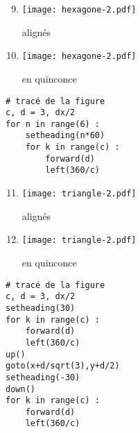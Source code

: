 \documentclass[11pt,a4paper]{article}
\begin{document}
\noindent\begin{minipage}[t]{5cm}
\begin{enumerate}\setcounter{enumi}{8}
\item \begin{minipage}{1.75cm}\texttt{[image: hexagone-2.pdf]}\end{minipage} alignés
\item \begin{minipage}{1.75cm}\texttt{[image: hexagone-2.pdf]}\end{minipage} en quinconce
\end{enumerate}
\end{minipage}
\hfill
\begin{minipage}[t]{7cm}\footnotesize
\begin{Verbatim}
# tracé de la figure
c, d = 3, dx/2
for n in range(6) :
    setheading(n*60)
    for k in range(c) :
        forward(d)
        left(360/c)
\end{Verbatim}
\end{minipage}
\vspace*{5mm}


\noindent\begin{minipage}[t]{5cm}
\begin{enumerate}\setcounter{enumi}{10}
\item \begin{minipage}{1.75cm}\texttt{[image: triangle-2.pdf]}\end{minipage} alignés
\item \begin{minipage}{1.75cm}\texttt{[image: triangle-2.pdf]}\end{minipage} en quinconce
\end{enumerate}
\end{minipage}
\hfill
\begin{minipage}[t]{7cm}\footnotesize
\begin{Verbatim}
# tracé de la figure
c, d = 3, dx/2
setheading(30)
for k in range(c) :
    forward(d)
    left(360/c)
up()
goto(x+d/sqrt(3),y+d/2)
setheading(-30)
down()
for k in range(c) :
    forward(d)
    left(360/c)
\end{Verbatim}
\end{minipage}
\vspace*{5mm}
\end{document}
